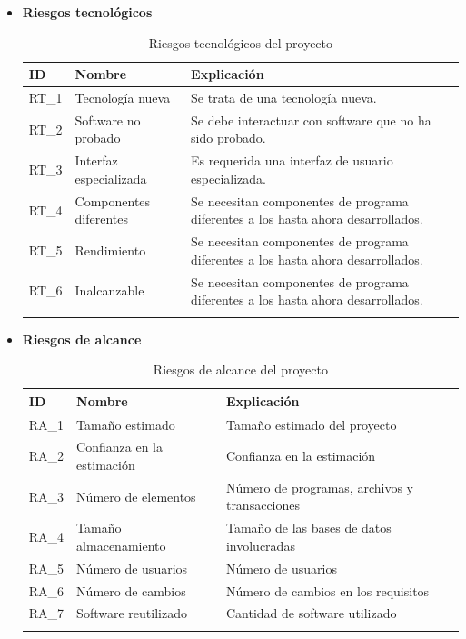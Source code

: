\begin{enumerate}
\begin{itemize}
\item \textbf{Riesgos tecnológicos}
\begin{longtable}{l p{5cm} p{9cm}}
\hline
\textbf{ID} & \textbf{Nombre} & \textbf{Explicación} \\
\hline
\endhead
\endfoot
RT\_1 & 
Tecnología nueva &
Se trata de una tecnología nueva.
 \\
RT\_2 & 
Software no probado &
Se debe interactuar con software que no ha sido probado. 
 \\
RT\_3 & 
Interfaz especializada &
Es requerida una interfaz de usuario especializada.
 \\
RT\_4 & 
Componentes diferentes &
Se necesitan componentes de programa diferentes a los hasta ahora desarrollados.
 \\
RT\_5 & 
Rendimiento &
Se necesitan componentes de programa diferentes a los hasta ahora desarrollados.
 \\
RT\_6 & 
Inalcanzable &
Se necesitan componentes de programa diferentes a los hasta ahora desarrollados.
 \\
\hline
\caption{Riesgos tecnológicos del proyecto}\label{ries_tecno}\\
\end{longtable}

\item \textbf{Riesgos de alcance}
\begin{longtable}{l p{5cm} p{9cm}}
\hline
\textbf{ID} & \textbf{Nombre} & \textbf{Explicación} \\
\hline
\endhead
\endfoot
RA\_1 & 
Tamaño estimado &
Tamaño estimado del proyecto
 \\
RA\_2 & 
Confianza en la estimación &
Confianza en la estimación
 \\
RA\_3 & 
Número de elementos &
Número de programas, archivos y transacciones
 \\
RA\_4 & 
Tamaño almacenamiento &
Tamaño de las bases de datos involucradas
 \\
RA\_5 & 
Número de usuarios &
Número de usuarios 
 \\
RA\_6 & 
Número de cambios &
Número de cambios en los requisitos
 \\
RA\_7 & 
Software reutilizado &
Cantidad de software utilizado
 \\
\hline
\caption{Riesgos de alcance del proyecto}\label{ries_alcan}\\
\end{longtable}


\end{itemize}
\end{enumerate}
